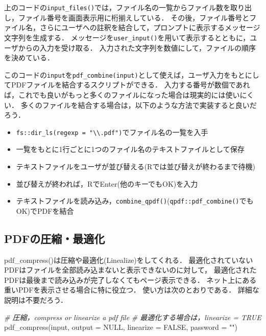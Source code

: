 \documentclass[
]{article}
\newenvironment{Shaded}{\begin{snugshade}}{\end{snugshade}}
\newcommand{\AttributeTok}[1]{\textcolor[rgb]{0.77,0.63,0.00}{#1}}
\newcommand{\CommentTok}[1]{\textcolor[rgb]{0.56,0.35,0.01}{\textit{#1}}}
\newcommand{\ConstantTok}[1]{\textcolor[rgb]{0.00,0.00,0.00}{#1}}
\newcommand{\FunctionTok}[1]{\textcolor[rgb]{0.00,0.00,0.00}{#1}}
\newcommand{\NormalTok}[1]{#1}
\newcommand{\StringTok}[1]{\textcolor[rgb]{0.31,0.60,0.02}{#1}}
\providecommand{\tightlist}{%
  \setlength{\itemsep}{0pt}\setlength{\parskip}{0pt}}
\begin{document}
上のコードの\texttt{input\_files()}では，ファイル名の一覧からファイル数を取り出し，ファイル番号を画面表示用に桁揃えしている．
その後，ファイル番号とファイル名，さらにユーザへの註釈を結合して，プロンプトに表示するメッセージ文字列を生成する．
メッセージを\texttt{user\_input()}を用いて表示するとともに，ユーザからの入力を受け取る．
入力された文字列を数値にして，ファイルの順序を決めている．

このコードの\texttt{input}を\texttt{pdf\_combine(input)}として使えば，ユーザ入力をもとにしてPDFファイルを結合するスクリプトができる．
入力する番号が数個であれば，これでも良いがもっと多くのファイルになった場合は現実的には使いにくい．
多くのファイルを結合する場合は，以下のような方法で実装すると良いだろう．

\begin{itemize}
\tightlist
\item
  \texttt{fs::dir\_ls(regexp\ =\ "\textbackslash{}\textbackslash{}.pdf")}でファイル名の一覧を入手\\
\item
  一覧をもとに1行ごとに1つのファイル名のテキストファイルとして保存\\
\item
  テキストファイルをユーザが並び替える(Rでは並び替えが終わるまで待機)\\
\item
  並び替えが終われば，RでEnter(他のキーでもOK)を入力\\
\item
  テキストファイルを読み込み，\texttt{combine\_qpdf()}(\texttt{qpdf::pdf\_combine()}でもOK)でPDFを結合
\end{itemize}

\hypertarget{pdfux306eux5727ux7e2eux6700ux9069ux5316}{%
\subsection{PDFの圧縮・最適化}\label{pdfux306eux5727ux7e2eux6700ux9069ux5316}}

pdf\_compress()は圧縮や最適化(Linealize)をしてくれる．
最適化されていないPDFはファイルを全部読み込まないと表示できないのに対して，
最適化されたPDFは最後まで読み込みが完了しなくてもページ表示できる．
ネット上にある重いPDFを表示させる場合に特に役立つ．
使い方は次のとおりである．
詳細な説明は不要だろう．

\begin{Shaded}
\begin{Highlighting}[]
  \CommentTok{\# 圧縮，compress or linearize a pdf file}
  \CommentTok{\# 最適化する場合は，linearize = TRUE}
\FunctionTok{pdf\_compress}\NormalTok{(input, }\AttributeTok{output =} \ConstantTok{NULL}\NormalTok{, }\AttributeTok{linearize =} \ConstantTok{FALSE}\NormalTok{, }\AttributeTok{password =} \StringTok{""}\NormalTok{)}
\end{Highlighting}
\end{Shaded}
\end{document}
